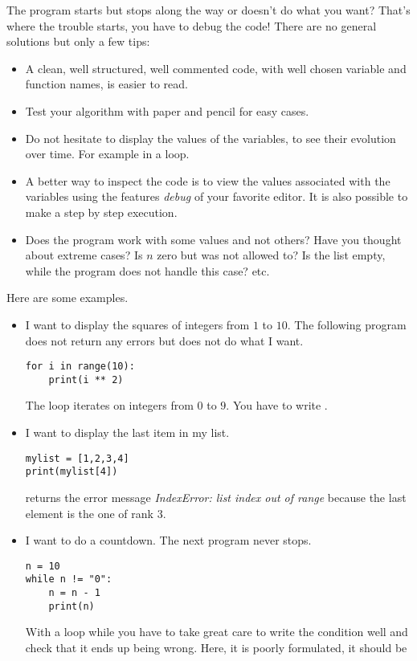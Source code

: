 \documentclass[11pt,class=report,crop=false]{standalone}
\begin{document}
The program starts but stops along the way or doesn't do what you want? That's where the trouble starts, you have to debug the code!  There are no general solutions but only a few tips:
\begin{itemize}
  \item A clean, well structured, well commented code, with well chosen variable and function names, is easier to read.

  \item Test your algorithm with paper and pencil for easy cases.

  \item Do not hesitate to display the values of the variables, to see their evolution over time. For example  in a loop. 
  
  \item A better way to inspect the code is to view the values associated with the variables using the features \emph{debug} of your favorite \Python{} editor. It is also possible to make a step by step execution.

  \item Does the program work with some values and not others? Have you thought about extreme cases? Is $n$ zero but was not allowed to? Is the list empty, while the program does not handle this case? etc.
\end{itemize}

 \medskip
 
Here are some examples.

\begin{itemize}
  \item I want to display the squares of integers from $1$ to $10$. The following program does not return any errors but does not do what I want.
\begin{lstlisting}
for i in range(10):
    print(i ** 2)
\end{lstlisting}
The loop iterates on integers from $0$ to $9$. You have to write .

  \item I want to display the last item in my list.
\begin{lstlisting}     
mylist = [1,2,3,4]
print(mylist[4])
\end{lstlisting}  
\Python{} returns the error message \emph{IndexError: list index out of range} because the last element is the one of rank $3$.


  \item I want to do a countdown. The next program never stops.
\begin{lstlisting}   
n = 10
while n != "0":
    n = n - 1
    print(n)
\end{lstlisting} 
With a loop \og{}while\fg{} you have to take great care to write the condition well and check that it ends up being wrong. Here, it is poorly formulated, it should be 


\end{itemize}
\end{document}
